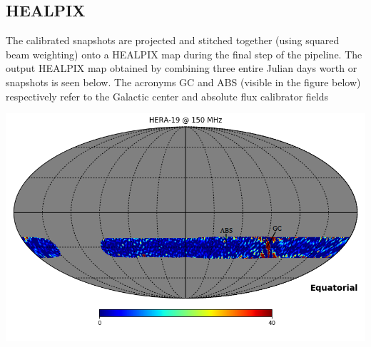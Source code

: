 \documentclass[a0,portrait]{a0poster}
\begin{document}
\begin{multicols}{2}

\section*{HEALPIX}

The calibrated snapshots are projected and stitched together (using squared beam weighting) onto a HEALPIX map during the final step of the pipeline. The output HEALPIX map 
obtained by combining three entire Julian days worth or snapshots is seen below. The acronyms GC and ABS (visible in the figure below) respectively refer 
to the Galactic center and absolute flux calibrator fields

\begin{center}\vspace{1cm}
\includegraphics[width=1\linewidth]{ALL_SKY0.png}
\end{center}\vspace{1cm}



\end{multicols}
\end{document}
